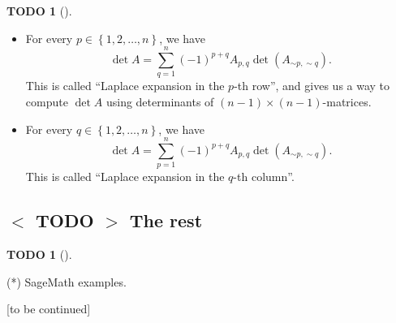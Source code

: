 \documentclass[numbers=enddot,12pt,final,onecolumn,notitlepage]{scrartcl}%
\theoremstyle{definition}
\newtheorem{quest}[theo]{TODO}
\newenvironment{todo}[1][]
{\begin{quest}[#1]\begin{leftbar}}
{\end{leftbar}\end{quest}}
\let\sumnonlimits\sum
\renewcommand{\sum}{\sumnonlimits\limits}
\begin{document}
\begin{todo}
\begin{itemize}
\item For every $p\in\left\{  1,2,\ldots,n\right\}  $, we have%
\[
\det A=\sum_{q=1}^{n}\left(  -1\right)  ^{p+q}A_{p,q}\det\left(  A_{\sim
p,\sim q}\right)  .
\]
This is called \textquotedblleft Laplace expansion in the $p$-th
row\textquotedblright, and gives us a way to compute $\det A$ using
determinants of $\left(  n-1\right)  \times\left(  n-1\right)  $-matrices.

\item For every $q\in\left\{  1,2,\ldots,n\right\}  $, we have%
\[
\det A=\sum_{p=1}^{n}\left(  -1\right)  ^{p+q}A_{p,q}\det\left(  A_{\sim
p,\sim q}\right)  .
\]
This is called \textquotedblleft Laplace expansion in the $q$-th
column\textquotedblright.
\end{itemize}
\end{todo}

\subsection{%
$<$%
TODO%
$>$
The rest}

\begin{todo}
(*) SageMath examples.
\end{todo}

[to be continued]
\end{document}
